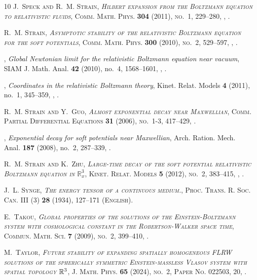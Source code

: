 \documentclass[reqno]{amsart}
\theoremstyle{definition}
\numberwithin{equation}{section}
\numberwithin{theorem}{section}
\begin{document}
\begin{thebibliography}{10}
\bgroup\scshape{}J.~Speck\egroup{} and \bgroup\scshape{}R.~M. Strain\egroup{}, \emph{Hilbert expansion from the {B}oltzmann equation to relativistic fluids}, Comm. Math. Phys. \textbf{304} (2011), no.~1, 229--280, , .

\bgroup\scshape{}R.~M. Strain\egroup{}, \emph{Asymptotic stability of the relativistic {B}oltzmann equation for the soft potentials}, Comm. Math. Phys. \textbf{300} (2010), no.~2, 529--597, , .

\bysame, \emph{Global {N}ewtonian limit for the relativistic {B}oltzmann equation near vacuum}, SIAM J. Math. Anal. \textbf{42} (2010), no.~4, 1568--1601, , .

\bysame, \emph{Coordinates in the relativistic {B}oltzmann theory}, Kinet. Relat. Models \textbf{4} (2011), no.~1, 345--359, , .

\bgroup\scshape{}R.~M. Strain\egroup{} and \bgroup\scshape{}Y.~Guo\egroup{}, \emph{Almost exponential decay near {M}axwellian}, Comm. Partial Differential Equations \textbf{31} (2006), no.~1-3, 417--429, .

\bysame, \emph{Exponential decay for soft potentials near {M}axwellian}, Arch. Ration. Mech. Anal. \textbf{187} (2008), no.~2, 287--339, .

\bgroup\scshape{}R.~M. Strain\egroup{} and \bgroup\scshape{}K.~Zhu\egroup{}, \emph{Large-time decay of the soft potential relativistic {B}oltzmann equation in {$\mathbb R^3_x$}}, Kinet. Relat. Models \textbf{5} (2012), no.~2, 383--415, , .

\bgroup\scshape{}J.~L. Synge\egroup{}, \emph{The energy tensor of a continuous medium.}, Proc. Trans. R. Soc. Can. III (3) \textbf{28} (1934), 127--171 (English).

\bgroup\scshape{}E.~Takou\egroup{}, \emph{Global properties of the solutions of the {E}instein-{B}oltzmann system with cosmological constant in the {R}obertson-{W}alker space time}, Commun. Math. Sci. \textbf{7} (2009), no.~2, 399--410, .

\bgroup\scshape{}M.~Taylor\egroup{}, \emph{Future stability of expanding spatially homogeneous {FLRW} solutions of the spherically symmetric {E}instein-massless {V}lasov system with spatial topology {$\Bbb R^3$}}, J. Math. Phys. \textbf{65} (2024), no.~2, Paper No. 022503, 20, .


\end{thebibliography}
\end{document}
